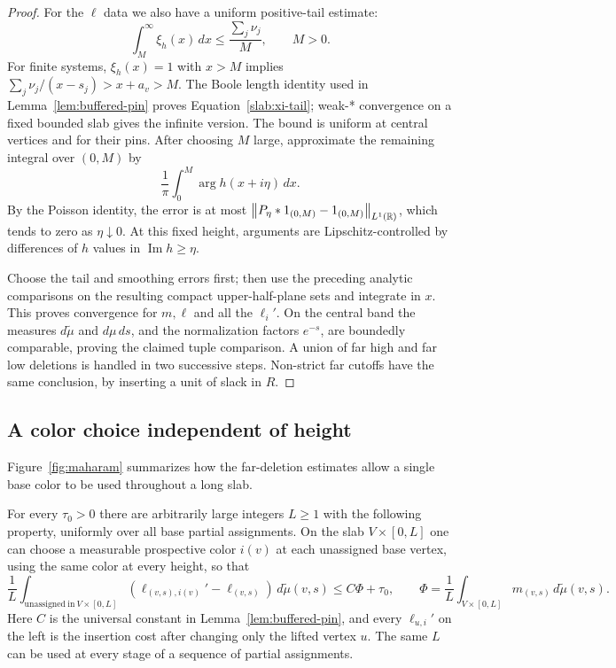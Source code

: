 \begin{proof}
For the $\ell$ data we also have a uniform positive-tail estimate:
\begin{equation}
 \int_M^\infty\xi_h(x)\,dx
 \leq \frac{\sum_j\nu_j}{M},\qquad M>0.
 \label{slab:xi-tail}
\end{equation}
For finite systems, $\xi_h(x)=1$ with $x>M$ implies
$\sum_j\nu_j/(x-s_j)>x+a_v>M$. The Boole length identity used in
Lemma~\ref{lem:buffered-pin} proves
Equation~\eqref{slab:xi-tail}; weak-* convergence on a fixed bounded
slab gives the infinite version. The bound is uniform at central
vertices and for their pins. After choosing $M$ large, approximate
the remaining integral over $(0,M)$ by
\[
 \frac1\pi\int_0^M\arg h(x+i\eta)\,dx.
\]
By the Poisson identity, the error is at most
$\left\lVert P_\eta*1_{(0,M)}-1_{(0,M)}\right\rVert_{L^1(\mathbb R)}$, which tends to zero
as $\eta\downarrow0$. At this fixed height, arguments are
Lipschitz-controlled by differences of $h$ values in
$\operatorname{Im}h\geq\eta$.

Choose the tail and smoothing errors first; then use the preceding
analytic comparisons on the resulting compact upper-half-plane
sets and integrate in $x$. This proves convergence for $m,\ell$ and
all the $\ell_i'$. On the central band the measures
$d\widetilde\mu$ and $d\mu\,ds$, and the normalization factors
$e^{-s}$, are boundedly comparable, proving the claimed tuple
comparison. A union of far high and far low deletions is handled in
two successive steps. Non-strict far cutoffs have the same conclusion,
by inserting a unit of slack in $R$.
\end{proof}

\subsection{A color choice independent of height}

Figure~\ref{fig:maharam} summarizes how the far-deletion estimates
allow a single base color to be used throughout a long slab.

\begin{lemma}
\label{lem:coherent-choice}
For every $\tau_0>0$ there are arbitrarily large integers $L\geq1$
with the following property, uniformly over all base partial
assignments. On the slab $V\times[0,L]$ one can choose a measurable
prospective color $i(v)$ at each unassigned base vertex, using the same
color at every height, so that
\begin{equation}
 \frac1L\int_{\mathrm{unassigned}\ \mathrm{in}\ V\times[0,L]}
       (\ell_{(v,s),i(v)}'-\ell_{(v,s)})\,d\widetilde\mu(v,s)
 \leq C\Phi+\tau_0,
 \qquad
 \Phi=\frac1L\int_{V\times[0,L]}m_{(v,s)}\,d\widetilde\mu(v,s).
 \label{slab:coherent-inequality}
\end{equation}
Here $C$ is the universal constant in
Lemma~\ref{lem:buffered-pin}, and every $\ell_{u,i}'$ on the left is
the insertion cost after changing only the lifted vertex $u$.
The same $L$ can be used at every stage of a sequence of partial
assignments.
\end{lemma}

